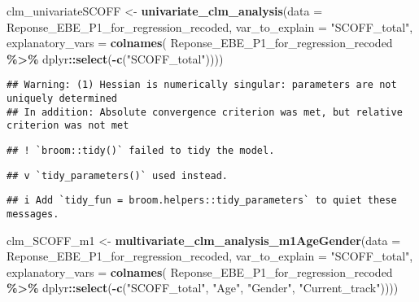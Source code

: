 \documentclass[
]{article}
\newenvironment{Shaded}{\begin{snugshade}}{\end{snugshade}}
\newcommand{\AttributeTok}[1]{\textcolor[rgb]{0.13,0.29,0.53}{#1}}
\newcommand{\FunctionTok}[1]{\textcolor[rgb]{0.13,0.29,0.53}{\textbf{#1}}}
\newcommand{\NormalTok}[1]{#1}
\newcommand{\OtherTok}[1]{\textcolor[rgb]{0.56,0.35,0.01}{#1}}
\newcommand{\SpecialCharTok}[1]{\textcolor[rgb]{0.81,0.36,0.00}{\textbf{#1}}}
\newcommand{\StringTok}[1]{\textcolor[rgb]{0.31,0.60,0.02}{#1}}
\begin{document}
\begin{Shaded}
\begin{Highlighting}[]
\NormalTok{clm\_univariateSCOFF }\OtherTok{\textless{}{-}}
  \FunctionTok{univariate\_clm\_analysis}\NormalTok{(}\AttributeTok{data =}\NormalTok{ Reponse\_EBE\_P1\_for\_regression\_recoded, }
                        \AttributeTok{var\_to\_explain =} \StringTok{"SCOFF\_total"}\NormalTok{, }
                        \AttributeTok{explanatory\_vars =}
                          \FunctionTok{colnames}\NormalTok{(}
\NormalTok{                            Reponse\_EBE\_P1\_for\_regression\_recoded }\SpecialCharTok{\%\textgreater{}\%}
\NormalTok{                              dplyr}\SpecialCharTok{::}\FunctionTok{select}\NormalTok{(}\SpecialCharTok{{-}}\FunctionTok{c}\NormalTok{(}\StringTok{"SCOFF\_total"}\NormalTok{))))}
\end{Highlighting}
\end{Shaded}

\begin{verbatim}
## Warning: (1) Hessian is numerically singular: parameters are not uniquely determined 
## In addition: Absolute convergence criterion was met, but relative criterion was not met
\end{verbatim}

\begin{verbatim}
## ! `broom::tidy()` failed to tidy the model.
\end{verbatim}

\begin{verbatim}
## v `tidy_parameters()` used instead.
\end{verbatim}

\begin{verbatim}
## i Add `tidy_fun = broom.helpers::tidy_parameters` to quiet these messages.
\end{verbatim}

\begin{Shaded}
\begin{Highlighting}[]
\NormalTok{clm\_SCOFF\_m1 }\OtherTok{\textless{}{-}}
  \FunctionTok{multivariate\_clm\_analysis\_m1AgeGender}\NormalTok{(}\AttributeTok{data =}\NormalTok{ Reponse\_EBE\_P1\_for\_regression\_recoded, }
                        \AttributeTok{var\_to\_explain =} \StringTok{"SCOFF\_total"}\NormalTok{, }
                        \AttributeTok{explanatory\_vars =}
                          \FunctionTok{colnames}\NormalTok{(}
\NormalTok{                            Reponse\_EBE\_P1\_for\_regression\_recoded }\SpecialCharTok{\%\textgreater{}\%}
\NormalTok{                              dplyr}\SpecialCharTok{::}\FunctionTok{select}\NormalTok{(}\SpecialCharTok{{-}}\FunctionTok{c}\NormalTok{(}\StringTok{"SCOFF\_total"}\NormalTok{, }\StringTok{"Age"}\NormalTok{, }\StringTok{"Gender"}\NormalTok{, }\StringTok{"Current\_track"}\NormalTok{))))}
\end{Highlighting}
\end{Shaded}
\end{document}
